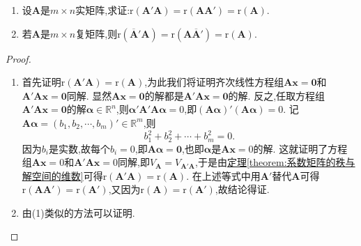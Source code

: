 \documentclass[../../main.tex]{subfiles}%
\begin{document}
\begin{proposition}\label{proposition:AA转置秩与A秩相等}
\begin{enumerate}[(1)]
\item 设\(\boldsymbol{A}\)是\(m\times n\)实矩阵,求证:\(\mathrm{r}(\boldsymbol{A}'\boldsymbol{A})=\mathrm{r}(\boldsymbol{A}\boldsymbol{A}')=\mathrm{r}(\boldsymbol{A})\).

\item 若\(\boldsymbol{A}\)是\(m\times n\)复矩阵,则\(\mathrm{r}\left(\overline{\boldsymbol{A}}'\boldsymbol{A}\right)=\mathrm{r}\left(\boldsymbol{A}\overline{\boldsymbol{A}}'\right)=\mathrm{r}(\boldsymbol{A})\).
\end{enumerate}
\end{proposition}
\begin{proof}
\begin{enumerate}[(1)]
\item 首先证明\(\mathrm{r}(\boldsymbol{A}'\boldsymbol{A})=\mathrm{r}(\boldsymbol{A})\),为此我们将证明齐次线性方程组\(\boldsymbol{A}\boldsymbol{x}=\boldsymbol{0}\)和\(\boldsymbol{A}'\boldsymbol{A}\boldsymbol{x}=\boldsymbol{0}\)同解. 显然\(\boldsymbol{A}\boldsymbol{x}=\boldsymbol{0}\)的解都是\(\boldsymbol{A}'\boldsymbol{A}\boldsymbol{x}=\boldsymbol{0}\)的解. 反之,任取方程组\(\boldsymbol{A}'\boldsymbol{A}\boldsymbol{x}=\boldsymbol{0}\)的解\(\boldsymbol{\alpha}\in\mathbb{R}^n\),则\(\boldsymbol{\alpha}'\boldsymbol{A}'\boldsymbol{A}\boldsymbol{\alpha}=0\),即\((\boldsymbol{A}\boldsymbol{\alpha})'(\boldsymbol{A}\boldsymbol{\alpha}) = 0\). 记\(\boldsymbol{A}\boldsymbol{\alpha}=(b_1,b_2,\cdots,b_m)'\in\mathbb{R}^m\),则
\[
b_1^2 + b_2^2+\cdots + b_m^2 = 0.
\]
因为\(b_i\)是实数,故每个\(b_i = 0\),即\(\boldsymbol{A}\boldsymbol{\alpha}=\boldsymbol{0}\),也即\(\boldsymbol{\alpha}\)是\(\boldsymbol{A}\boldsymbol{x}=0\)的解. 这就证明了方程组\(\boldsymbol{A}\boldsymbol{x}=0\)和\(\boldsymbol{A}'\boldsymbol{A}\boldsymbol{x}=0\)同解,即\(V_{\boldsymbol{A}}=V_{\boldsymbol{A}'\boldsymbol{A}}\),于是由\hyperref[theorem:系数矩阵的秩与解空间的维数]{定理\ref{theorem:系数矩阵的秩与解空间的维数}}可得\(\mathrm{r}(\boldsymbol{A}'\boldsymbol{A})=\mathrm{r}(\boldsymbol{A})\). 在上述等式中用\(\boldsymbol{A}'\)替代\(\boldsymbol{A}\)可得\(\mathrm{r}(\boldsymbol{A}\boldsymbol{A}')=\mathrm{r}(\boldsymbol{A}')\),又因为\(\mathrm{r}(\boldsymbol{A})=\mathrm{r}(\boldsymbol{A}')\),故结论得证.

\item 由(1)类似的方法可以证明.
\end{enumerate}
\end{proof}
\end{document}
